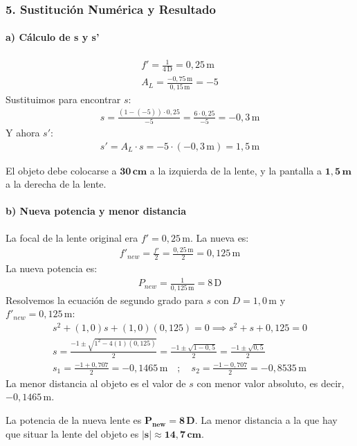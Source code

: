 \subsubsection*{5. Sustitución Numérica y Resultado}
\paragraph*{a) Cálculo de s y s'}
\begin{gather}
    f' = \frac{1}{4\,\text{D}} = 0,25\,\text{m} \\
    A_L = \frac{-0,75\,\text{m}}{0,15\,\text{m}} = -5
\end{gather}
Sustituimos para encontrar $s$:
\begin{gather}
    s = \frac{(1 - (-5)) \cdot 0,25}{-5} = \frac{6 \cdot 0,25}{-5} = -0,3\,\text{m}
\end{gather}
Y ahora $s'$:
\begin{gather}
    s' = A_L \cdot s = -5 \cdot (-0,3\,\text{m}) = 1,5\,\text{m}
\end{gather}
\begin{cajaresultado}
    El objeto debe colocarse a $\boldsymbol{30\,\textbf{cm}}$ a la izquierda de la lente, y la pantalla a $\boldsymbol{1,5\,\textbf{m}}$ a la derecha de la lente.
\end{cajaresultado}

\paragraph*{b) Nueva potencia y menor distancia}
La focal de la lente original era $f' = 0,25\,\text{m}$. La nueva es:
\begin{gather}
    f'_{new} = \frac{f'}{2} = \frac{0,25\,\text{m}}{2} = 0,125\,\text{m}
\end{gather}
La nueva potencia es:
\begin{gather}
    P_{new} = \frac{1}{0,125\,\text{m}} = 8\,\text{D}
\end{gather}
Resolvemos la ecuación de segundo grado para $s$ con $D=1,0\,\text{m}$ y $f'_{new}=0,125\,\text{m}$:
\begin{gather}
    s^2 + (1,0)s + (1,0)(0,125) = 0 \implies s^2 + s + 0,125 = 0 \nonumber \\
    s = \frac{-1 \pm \sqrt{1^2 - 4(1)(0,125)}}{2} = \frac{-1 \pm \sqrt{1 - 0,5}}{2} = \frac{-1 \pm \sqrt{0,5}}{2} \nonumber \\
    s_1 = \frac{-1 + 0,707}{2} = -0,1465\,\text{m} \quad ; \quad s_2 = \frac{-1 - 0,707}{2} = -0,8535\,\text{m}
\end{gather}
La menor distancia al objeto es el valor de $s$ con menor valor absoluto, es decir, $-0,1465\,\text{m}$.
\begin{cajaresultado}
    La potencia de la nueva lente es $\boldsymbol{P_{new} = 8\,\textbf{D}}$. La menor distancia a la que hay que situar la lente del objeto es $\boldsymbol{|s| \approx 14,7\,\textbf{cm}}$.
\end{cajaresultado}

